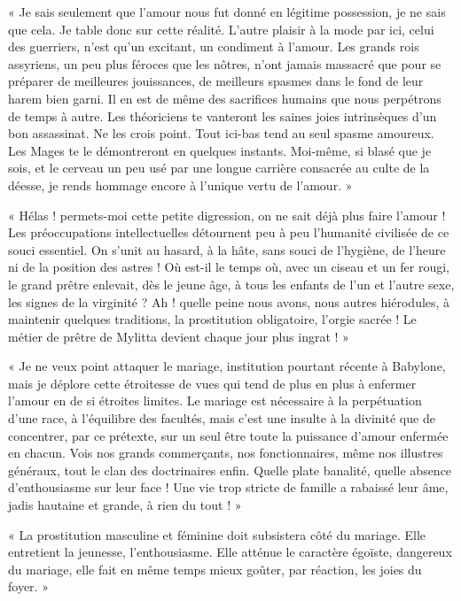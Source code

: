 \documentclass[a4paper, 11pt, oneside, polutonikogreek, french]{article}
\begin{document}
« Je sais seulement que l'amour nous fut donné en légitime possession, je ne sais que cela. Je table donc sur cette réalité. L'autre plaisir à la mode par ici, celui des guerriers, n'est qu'un excitant, un condiment à l'amour. Les grands rois assyriens, un peu plus féroces que les nôtres, n'ont jamais massacré que pour se préparer de meilleures jouissances, de meilleurs spasmes dans le fond de leur harem bien garni. Il en est de même des sacrifices humains que nous perpétrons de temps à autre. Les théoriciens te vanteront les saines joies intrinsèques d'un bon assassinat. Ne les crois point. Tout ici-bas tend au seul spasme amoureux. Les Mages te le démontreront en quelques instants. Moi-même, si blasé que je sois, et le cerveau un peu usé par une longue carrière consacrée au culte de la déesse, je rends hommage encore à l'unique vertu de l'amour. »

« Hélas ! permets-moi cette petite digression, on ne sait déjà plus faire l'amour ! Les préoccupations intellectuelles détournent peu à peu l'humanité civilisée de ce souci essentiel. On s'unit au hasard, à la hâte, sans souci de l'hygiène, de l'heure ni de la position des astres ! Où est-il le temps où, avec un ciseau et un fer rougi, le grand prêtre enlevait, dès le jeune âge, à tous les enfants de l'un et l'autre sexe, les signes de la virginité ? Ah ! quelle peine nous avons, nous autres hiérodules, à maintenir quelques traditions, la prostitution obligatoire, l'orgie sacrée ! Le métier de prêtre de Mylitta devient chaque jour plus ingrat ! »

« Je ne veux point attaquer le mariage, institution pourtant récente à Babylone, mais je déplore cette étroitesse de vues qui tend de plus en plus à enfermer l'amour en de si étroites limites. Le mariage est nécessaire à la perpétuation d'une race, à l'équilibre des facultés, mais c'est une insulte à la divinité que de concentrer, par ce prétexte, sur un seul être toute la puissance d'amour enfermée en chacun. Vois nos grands commerçants, nos fonctionnaires, même nos illustres généraux, tout le clan des doctrinaires enfin. Quelle plate banalité, quelle absence d'enthousiasme sur leur face ! Une vie trop stricte de famille a rabaissé leur âme, jadis hautaine et grande, à rien du tout ! »

« La prostitution masculine et féminine doit subsistera côté du mariage. Elle entretient la jeunesse, l'enthousiasme. Elle atténue le caractère égoïste, dangereux du mariage, elle fait en même temps mieux goûter, par réaction, les joies du foyer. »
\end{document}
